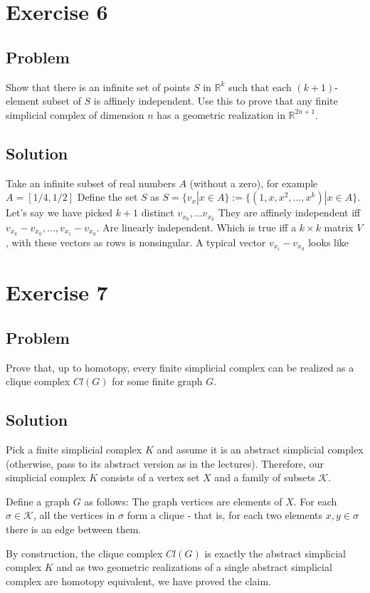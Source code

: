 \documentclass{article}
\begin{document}
\section*{Exercise 6}
\subsection*{Problem}
Show that there is an infinite set of points $S$ in $\mathbb{R}^k$ such that each $(k+1)$-element subset of $S$ is affinely independent. Use this to prove that any finite simplicial complex of dimension $n$ has a geometric realization in $\mathbb{R}^{2n+1}$.
\subsection*{Solution}
Take an infinite subset of real numbers $A$ (without a zero), for example $A = [1/4,1/2]$
Define the set $S$ as $S = \{ v_x | x \in A \} := \{(1,x,x^2,\dots,x^k) | x \in A \}$.
Let's say we have picked $k+1$ distinct $v_{x_0}, \dots v_{x_k}$
They are affinely independent iff $v_{x_k}-v_{x_0}, \dots , v_{x_1}-v_{x_0}$. Are linearly independent. Which is true iff a $k\times k$ matrix $V$, with these vectors as rows is nonsingular.
A typical vector $v_{x_i} - v_{x_0}$ looks like 


\section*{Exercise 7}
\subsection*{Problem}
Prove that, up to homotopy, every finite simplicial complex can be realized as a clique complex $Cl(G)$ for some finite graph $G$.
\subsection*{Solution}
Pick a finite simplicial complex $K$ and assume it is an abstract simplicial complex (otherwise, pass to its abstract version as in the lectures).
Therefore, our simplicial complex $K$ consists of a vertex set $X$ and a family of subsets $\mathcal{K}$.

Define a graph $G$ as follows: The graph vertices are elements of $X$.
For each $\sigma \in \mathcal{K}$, all the vertices in $\sigma$ form a clique - that is, for each two elements $x, y \in \sigma$ there is an edge between them.

By construction, the clique complex $Cl(G)$ is exactly the abstract simplicial complex $K$ and as two geometric realizations of a single abstract simplicial complex are homotopy equivalent, we have proved the claim.
\end{document}
